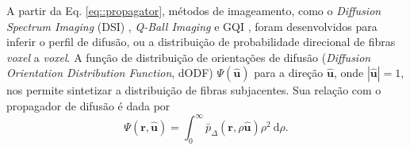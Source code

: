 \documentclass[
    12pt,                %
    oneside,            %
    a4paper,            %
    english,            %
    french,                %
    spanish,            %
    brazil                %
    ]{abntex2}
\begin{document}
A partir da Eq. \ref{eq::propagator}, métodos de imageamento, como o \textit{Diffusion Spectrum Imaging} (DSI) \cite{tuch2002, wedeen2005}, \textit{Q-Ball Imaging} \cite{TuchQBall2004} e GQI \cite{yeh2010}, foram desenvolvidos para inferir o perfil de difusão, ou a distribuição de probabilidade direcional de fibras \textit{voxel} a \textit{voxel}. 
A função de distribuição de orientações de difusão (\textit{Diffusion Orientation Distribution Function}, dODF) $\Psi(\mathbf{\hat{u}})$ para a direção $\mathbf{\hat{u}}$, onde $|\mathbf{\hat{u}}| = 1$,  nos permite sintetizar a distribuição de fibras subjacentes. Sua relação com o propagador de difusão é dada por \cite{tuch2002}
\begin{equation}
\label{eq::dodf_propagador}
\Psi(\mathbf{\mathbf{r},\hat{u}})=\int_{0}^{\infty} \bar{p}_{\Delta}(\mathbf{r}, \rho  \mathbf{\hat{u}}) \rho^2 \mathrm{~d}\rho .
\end{equation}






\end{document}
